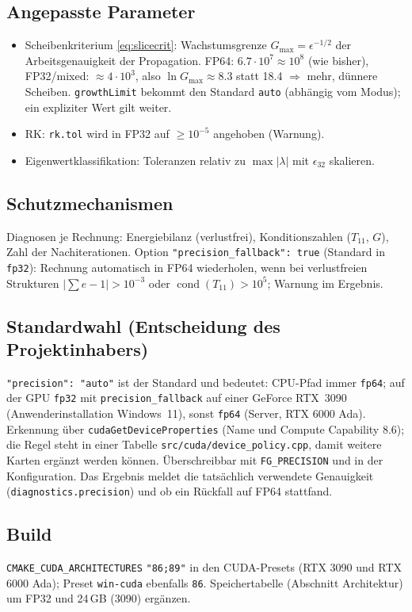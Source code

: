 \subsection{Angepasste Parameter}
\begin{itemize}[nosep]
  \item Scheibenkriterium \eqref{eq:slicecrit}: Wachstumsgrenze $G_{\max}=\epsilon^{-1/2}$ der Arbeitsgenauigkeit der
        Propagation. FP64: $6.7\cdot10^{7}\approx10^8$ (wie bisher), FP32/mixed: $\approx4\cdot10^{3}$, also
        $\ln G_{\max}\approx8.3$ statt 18.4 $\Rightarrow$ mehr, dünnere Scheiben. \verb|growthLimit| bekommt den Standard
        \verb|auto| (abhängig vom Modus); ein expliziter Wert gilt weiter.
  \item RK: \verb|rk.tol| wird in FP32 auf $\ge10^{-5}$ angehoben (Warnung).
  \item Eigenwertklassifikation: Toleranzen relativ zu $\max|\lambda|$ mit $\epsilon_{32}$ skalieren.
\end{itemize}

\subsection{Schutzmechanismen}
Diagnosen je Rechnung: Energiebilanz (verlustfrei), Konditionszahlen ($T_{11}$, $G$), Zahl der Nachiterationen.
Option \verb|"precision_fallback": true| (Standard in \verb|fp32|): Rechnung automatisch in FP64 wiederholen, wenn bei
verlustfreien Strukturen $|\sum e-1|>10^{-3}$ oder $\operatorname{cond}(T_{11})>10^{5}$; Warnung im Ergebnis.

\subsection{Standardwahl (Entscheidung des Projektinhabers)}
\verb|"precision": "auto"| ist der Standard und bedeutet: CPU-Pfad immer \verb|fp64|; auf der GPU \verb|fp32| mit
\verb|precision_fallback| auf einer GeForce RTX~3090 (Anwenderinstallation Windows~11), sonst \verb|fp64|
(Server, RTX 6000 Ada). Erkennung über \verb|cudaGetDeviceProperties| (Name und Compute Capability 8.6); die Regel steht
in einer Tabelle \verb|src/cuda/device_policy.cpp|, damit weitere Karten ergänzt werden können. Überschreibbar mit
\verb|FG_PRECISION| und in der Konfiguration. Das Ergebnis meldet die tatsächlich verwendete Genauigkeit
(\verb|diagnostics.precision|) und ob ein Rückfall auf FP64 stattfand.

\subsection{Build}
\verb|CMAKE_CUDA_ARCHITECTURES| \verb|"86;89"| in den CUDA-Presets (RTX 3090 und RTX 6000 Ada); Preset
\verb|win-cuda| ebenfalls \verb|86|. Speichertabelle (Abschnitt Architektur) um FP32 und 24\,GB (3090) ergänzen.

